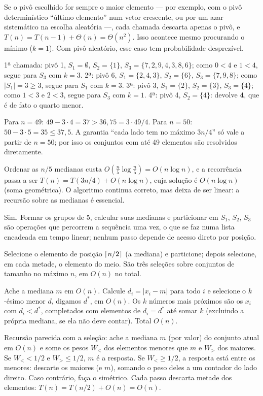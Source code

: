  Se o pivô escolhido for sempre o maior elemento --- por exemplo, com o pivô determinístico ``último elemento'' num vetor crescente, ou por um azar sistemático na escolha aleatória ---, cada chamada descarta apenas o pivô, e $T(n)=T(n-1)+\Theta(n)=\Theta(n^2)$. Isso acontece mesmo procurando o mínimo ($k=1$). Com pivô aleatório, esse caso tem probabilidade desprezível.

 1ª chamada: pivô 1, $S_1=\emptyset$, $S_2=\{1\}$, $S_3=\{7,2,9,4,3,8,6\}$; como $0<4$ e $1<4$, segue para $S_3$ com $k=3$. 2ª: pivô 6, $S_1=\{2,4,3\}$, $S_2=\{6\}$, $S_3=\{7,9,8\}$; como $|S_1|=3\ge3$, segue para $S_1$ com $k=3$. 3ª: pivô 3, $S_1=\{2\}$, $S_2=\{3\}$, $S_3=\{4\}$; como $1<3$ e $2<3$, segue para $S_3$ com $k=1$. 4ª: pivô 4, $S_2=\{4\}$: devolve \textbf{4}, que é de fato o quarto menor.

 Para $n=49$: $49-3\cdot4=37>36{,}75=3\cdot49/4$. Para $n=50$: $50-3\cdot5=35\le37{,}5$. A garantia ``cada lado tem no máximo $3n/4$'' só vale a partir de $n=50$; por isso os conjuntos com até 49 elementos são resolvidos diretamente.

 Ordenar as $n/5$ medianas custa $O(\frac n5\log\frac n5)=O(n\log n)$, e a recorrência passa a ser $T(n)=T(3n/4)+O(n\log n)$, cuja solução é $O(n\log n)$ (soma geométrica). O algoritmo continua correto, mas deixa de ser linear: a recursão sobre as medianas é essencial.

 Sim. Formar os grupos de 5, calcular suas medianas e particionar em $S_1$, $S_2$, $S_3$ são operações que percorrem a sequência uma vez, o que se faz numa lista encadeada em tempo linear; nenhum passo depende de acesso direto por posição.

 Selecione o elemento de posição $\lceil n/2\rceil$ (a mediana) e particione; depois selecione, em cada metade, o elemento do meio. São três seleções sobre conjuntos de tamanho no máximo $n$, em $O(n)$ no total.

 Ache a mediana $m$ em $O(n)$. Calcule $d_i=|x_i-m|$ para todo $i$ e selecione o $k$-ésimo menor $d$, digamos $d^*$, em $O(n)$. Os $k$ números mais próximos são os $x_i$ com $d_i<d^*$, completados com elementos de $d_i=d^*$ até somar $k$ (excluindo a própria mediana, se ela não deve contar). Total $O(n)$.

 Recursão parecida com a seleção: ache a mediana $m$ (por valor) do conjunto atual em $O(n)$ e some os pesos $W_<$ dos elementos menores que $m$ e $W_>$ dos maiores. Se $W_<<1/2$ e $W_>\le1/2$, $m$ é a resposta. Se $W_<\ge1/2$, a resposta está entre os menores: descarte os maiores (e $m$), somando o peso deles a um contador do lado direito. Caso contrário, faça o simétrico. Cada passo descarta metade dos elementos: $T(n)=T(n/2)+O(n)=O(n)$.


